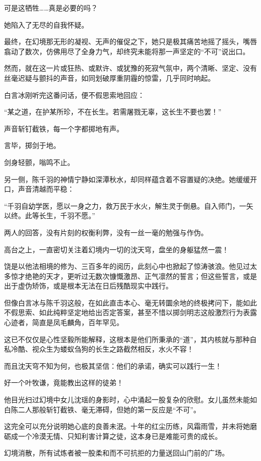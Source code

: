 可是这牺牲……真是必要的吗？

她陷入了无尽的自我怀疑。

最终，在幻境那无形的凝视、无声的催促之下，她只是极其痛苦地摇了摇头，嘴唇翕动了数次，仿佛用尽了全身力气，却终究未能将那一声坚定的“不可”说出口。

然而，就在这一片或狂热、或默许、或犹豫的死寂气氛中，两个清晰、坚定、没有丝毫迟疑与颤抖的声音，如同划破厚重阴霾的惊雷，几乎同时响起。

白言冰刚听完这番问话，便不假思索地回应：

“某之道，在护某所珍，不在长生。若需屠戮无辜，这长生不要也罢！”

声音斩钉截铁，每一个字都掷地有声。

言毕，掷剑于地。

剑身轻颤，嗡鸣不止。

另一侧，陈千羽的神情宁静如深潭秋水，却同样蕴含着不容置疑的决绝。她缓缓开口，声音清越而平稳：

“千羽自幼学医，愿以一身之力，救万民于水火，解生灵于倒悬。自入师门，一矢以终。此等长生，千羽不愿。”

两人的回答，没有片刻的权衡利弊，没有一丝一毫的勉强与作伪。

高台之上，一直密切关注着幻境内一切的沈天穹，盘坐的身躯猛然一震！

饶是以他法相境的修为、三百多年的阅历，此刻心中也掀起了惊涛骇浪。他见过太多惊才绝艳的天才，更听过无数次慷慨激昂、正气凛然的誓言；但这些誓言，或是出于虚伪矫饰，或是根本无法在日后残酷现实中践行。

但像白言冰与陈千羽这般，在如此直击本心、毫无转圜余地的终极拷问下，能如此不假思索、如此纯粹坚定地给出否定答案，甚至不惜以掷剑明志这般激烈行为表露心迹者，简直是凤毛麟角，百年罕见。

这已不仅仅是心性坚毅所能解释，这根本是他们所秉承的“道”，其内核就与那种自私冷酷、视众生为蝼蚁刍狗的长生之路截然相反，水火不容！

而且沈天穹不知为何，也极其坚信：他们的承诺，确实可以践行一生！

好一个叶牧谦，竟能教出这样的徒弟！

他目光扫过幻境中女儿沈瑶的身影时，心中涌起一股复杂的欣慰。女儿虽然未能如白陈二人那般斩钉截铁、毫无滞碍，但她的第一反应是“不可”。

这完全可以充分说明她心底的良善未泯。十年的红尘历练，风霜雨雪，并未将她磨砺成一个冷漠无情、只知利害计算之徒，这本身已是难能可贵的成长。

\vspace{2em}

幻境消散，所有试炼者被一股柔和而不可抗拒的力量送回山门前的广场。

